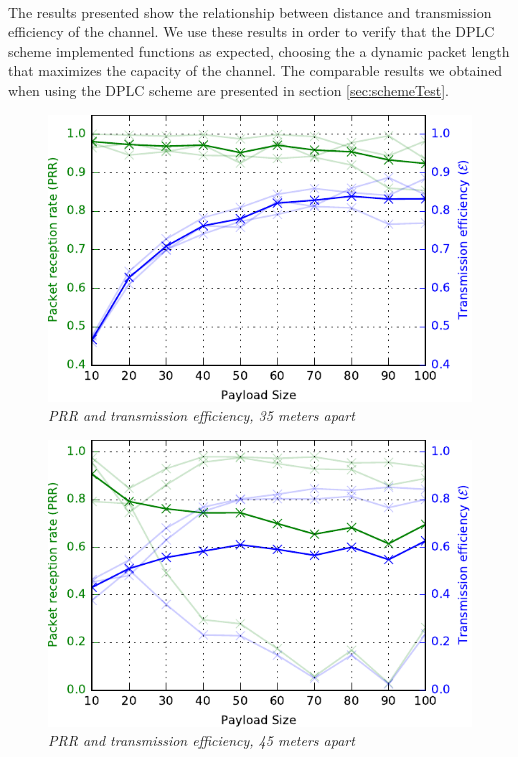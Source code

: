 \paragraph{} The results presented show the relationship between distance and transmission efficiency of the channel. We use these results in order to verify that the DPLC scheme implemented functions as expected, choosing the a dynamic packet length that maximizes the capacity of the channel. The comparable results we obtained when using the DPLC scheme are presented in section \ref{sec:schemeTest}.

\begin{figure}
\centering
\includegraphics[scale=1]{figs/35mTest.pdf} 
\caption{\textit{PRR and transmission efficiency, 35 meters apart}\label{fig:35mTest}}
\end{figure}

\begin{figure}
\centering
\includegraphics[scale=1]{figs/45mTest.pdf} 
\caption{\textit{PRR and transmission efficiency, 45 meters apart}\label{fig:45mTest}}
\end{figure}